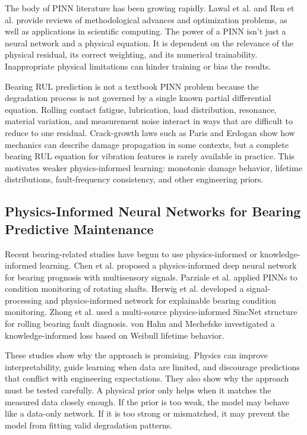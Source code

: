 The body of PINN literature has been growing rapidly. Lawal et al. \cite{lawal2022} and Ren et al. \cite{ren2025} provide reviews of methodological advances and optimization problems, as well as applications in scientific computing. The power of a PINN isn't just a neural network and a physical equation. It is dependent on the relevance of the physical residual, its correct weighting, and its numerical trainability. Inappropriate physical limitations can hinder training or bias the results.

Bearing RUL prediction is not a textbook PINN problem because the degradation process is not governed by a single known partial differential equation. Rolling contact fatigue, lubrication, load distribution, resonance, material variation, and measurement noise interact in ways that are difficult to reduce to one residual. Crack-growth laws such as Paris and Erdogan \cite{paris1963} show how mechanics can describe damage propagation in some contexts, but a complete bearing RUL equation for vibration features is rarely available in practice. This motivates weaker physics-informed learning: monotonic damage behavior, lifetime distributions, fault-frequency consistency, and other engineering priors.

\subsection{Physics-Informed Neural Networks for Bearing Predictive Maintenance}

Recent bearing-related studies have begun to use physics-informed or knowledge-informed learning. Chen et al. \cite{chen2022} proposed a physics-informed deep neural network for bearing prognosis with multisensory signals. Parziale et al. \cite{parziale2023} applied PINNs to condition monitoring of rotating shafts. Herwig et al. \cite{herwig2025} developed a signal-processing and physics-informed network for explainable bearing condition monitoring. Zhong et al. \cite{zhong2025} used a multi-source physics-informed SincNet structure for rolling bearing fault diagnosis. von Hahn and Mechefske \cite{vonhahn2022} investigated a knowledge-informed loss based on Weibull lifetime behavior.

These studies show why the approach is promising. Physics can improve interpretability, guide learning when data are limited, and discourage predictions that conflict with engineering expectations. They also show why the approach must be tested carefully. A physical prior only helps when it matches the measured data closely enough. If the prior is too weak, the model may behave like a data-only network. If it is too strong or mismatched, it may prevent the model from fitting valid degradation patterns.

